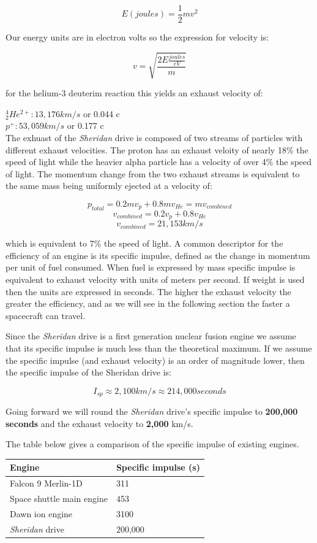 \documentclass[12pt]{article} %
\begin{document}
$$E (joules) = \frac{1}{2}mv^2$$

Our energy units are in electron volts so the expression for velocity is:

$$v = \sqrt{\frac{2 E \frac{joules}{eV}}{m}}$$

for the helium-3 deuterim reaction this yields an exhaust velocity of:

$^4_2He^{2+}: 13,176 km/s$ or 0.044 c\\
$p^{+}: 53,059 km/s$ or 0.177 c\\

The exhuast of the \textit{Sheridan} drive is composed of two streams of particles with different exhaust velocities. The proton has an exhaust veloity of nearly 18\% the speed of light while the heavier alpha particle has a velocity of over 4\% the speed of light. The momentum change from the two exhaust streams is equivalent to the same mass being uniformly ejected at a velocity of:

$$p_{total} = 0.2mv_{p} + 0.8mv_{He} = mv_{combined}$$
$$v_{combined} = 0.2v_{p} + 0.8v_{He}$$
$$v_{combined} =  21,153km/s$$

which is equivalent to 7\% the speed of light. A common descriptor for the efficiency of an engine is its specific impulse, defined as the change in momentum per unit of fuel consumed.  When fuel is expressed by mass specific impulse is equivalent to exhaust velocity with units of meters per second. If weight is used then the units are expressed in seconds. The higher the exhaust velocity the greater the efficiency, and as we will see in the following section the faster a spacecraft can travel.

Since the \textit{Sheridan} drive is a first generation nuclear fusion engine we assume that its specific impulse is much less than the theoretical maximum. If we assume the specific impulse (and exhaust velocity) is an order of magnitude lower, then the specific impulse of the Sheridan drive is:

$$I_{sp} \approx 2,100 km/s \approx 214,000 seconds$$

Going forward we will round the \textit{Sheridan} drive's specific impulse to \textbf{200,000 seconds} and the exhaust velocity to \textbf{2,000} km/s.

The table below gives a comparison of the specific impulse of existing engines.

\begin{center}
\begin{tabular}{|m{5 cm}| m{5 cm}|} \hline
\textbf{Engine} & \textbf{Specific impulse (s)}\\ \hline
Falcon 9 Merlin-1D &  311 \\ \hline
Space shuttle main engine &  453 \\ \hline
Dawn ion engine   &  3100\\ \hline
\textit{Sheridan} drive & 200,000\\ \hline
\end{tabular}
\end{center}
\end{document}
